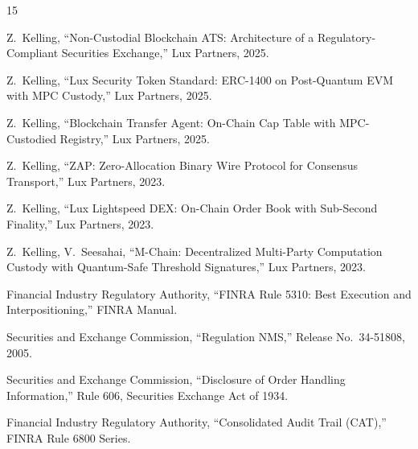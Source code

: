 \documentclass[11pt,a4paper]{article}
\begin{document}
\begin{thebibliography}{15}

Z.~Kelling,
``Non-Custodial Blockchain ATS: Architecture of a Regulatory-Compliant Securities Exchange,''
Lux Partners, 2025.

Z.~Kelling,
``Lux Security Token Standard: ERC-1400 on Post-Quantum EVM with MPC Custody,''
Lux Partners, 2025.

Z.~Kelling,
``Blockchain Transfer Agent: On-Chain Cap Table with MPC-Custodied Registry,''
Lux Partners, 2025.

Z.~Kelling,
``ZAP: Zero-Allocation Binary Wire Protocol for Consensus Transport,''
Lux Partners, 2023.

Z.~Kelling,
``Lux Lightspeed DEX: On-Chain Order Book with Sub-Second Finality,''
Lux Partners, 2023.

Z.~Kelling, V.~Seesahai,
``M-Chain: Decentralized Multi-Party Computation Custody with Quantum-Safe Threshold Signatures,''
Lux Partners, 2023.

Financial Industry Regulatory Authority,
``FINRA Rule 5310: Best Execution and Interpositioning,''
FINRA Manual.

Securities and Exchange Commission,
``Regulation NMS,''
Release No.~34-51808, 2005.

Securities and Exchange Commission,
``Disclosure of Order Handling Information,''
Rule 606, Securities Exchange Act of 1934.

Financial Industry Regulatory Authority,
``Consolidated Audit Trail (CAT),''
FINRA Rule 6800 Series.

\end{thebibliography}
\end{document}
